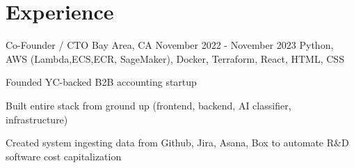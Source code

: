 \documentclass[letterpaper]{simjega-resume}
\begin{document}






%
%

\section{Experience}
\jgsectionline

{Co-Founder / CTO}
{Bay Area, CA}
{November 2022 - November 2023}
{Python, AWS (Lambda,ECS,ECR, SageMaker), Docker, Terraform, React, HTML, CSS}
{\begin{tightitemize}
\item[] Founded YC-backed B2B accounting startup
\item[] Built entire stack from ground up (frontend, backend, AI classifier, infrastructure)
\item[] Created system ingesting data from Github, Jira, Asana, Box to automate R\&D software cost capitalization
\end{tightitemize}}
\end{document}
